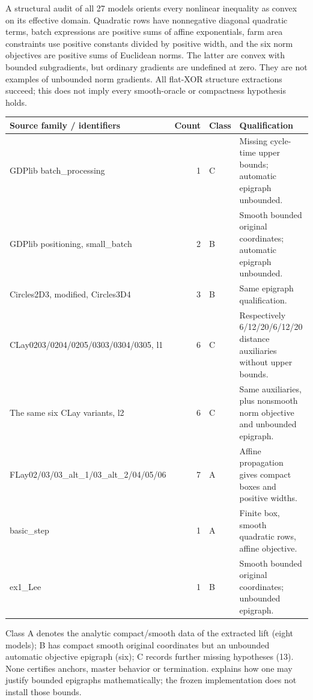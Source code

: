 A structural audit of all 27 models orients every nonlinear inequality as convex on its effective domain. Quadratic rows have nonnegative diagonal quadratic terms, batch expressions are positive sums of affine exponentials, farm area constraints use positive constants divided by positive width, and the six norm objectives are positive sums of Euclidean norms. The latter are convex with bounded subgradients, but ordinary gradients are undefined at zero. They are not examples of unbounded norm gradients. All flat-XOR structure extractions succeed; this does not imply every smooth-oracle or compactness hypothesis holds.

\begin{center}\small
\begin{tabularx}{\linewidth}{lrlX}\toprule
Source family / identifiers & Count & Class & Qualification\\\midrule
GDPlib batch\_processing & 1 & C & Missing cycle-time upper bounds; automatic epigraph unbounded.\\
GDPlib positioning, small\_batch & 2 & B & Smooth bounded original coordinates; automatic epigraph unbounded.\\
Circles2D3, modified, Circles3D4 & 3 & B & Same epigraph qualification.\\
CLay0203/0204/0205/0303/0304/0305, l1 & 6 & C & Respectively 6/12/20/6/12/20 distance auxiliaries without upper bounds.\\
The same six CLay variants, l2 & 6 & C & Same auxiliaries, plus nonsmooth norm objective and unbounded epigraph.\\
FLay02/03/03\_alt\_1/03\_alt\_2/04/05/06 & 7 & A & Affine propagation gives compact boxes and positive widths.\\
basic\_step & 1 & A & Finite box, smooth quadratic rows, affine objective.\\
ex1\_Lee & 1 & B & Smooth bounded original coordinates; unbounded epigraph.\\\bottomrule
\end{tabularx}\end{center}
Class A denotes the analytic compact/smooth data of the extracted lift (eight models); B has compact smooth original coordinates but an unbounded automatic objective epigraph (six); C records further missing hypotheses (13). None certifies anchors, master behavior or termination.  explains how one may justify bounded epigraphs mathematically; the frozen implementation does not install those bounds.

